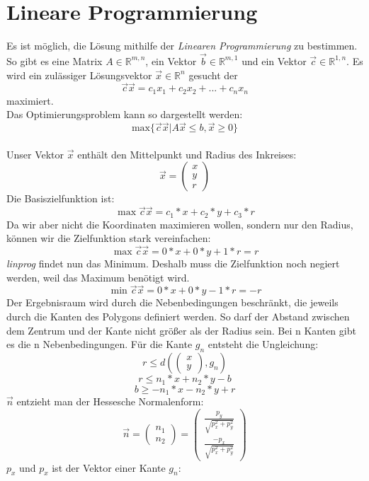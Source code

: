 \documentclass[conference]{IEEEtran}
\begin{document}
	\section{Lineare Programmierung}
	Es ist möglich, die Lösung mithilfe der \textit{Linearen Programmierung} zu bestimmen. So gibt es eine Matrix $A \in \mathbb{R}^{m,n}$, ein Vektor $\vec{b} \in \mathbb{R}^{m,1}$ und ein Vektor $\vec{c} \in \mathbb{R}^{1,n}$.	Es wird ein zulässiger Lösungsvektor $\vec{x} \in \mathbb{R}^{n}$ gesucht der
	\[ \vec{c}\vec{x} = c_1x_1 + c_2x_2+ ... + c_nx_n \]
	maximiert.\\
	Das Optimierungsproblem kann so dargestellt werden:
	\[ \text{max}\{\vec{c}\vec{x} | A\vec{x} \leq b, \vec{x} \geq 0\} \]
	\cite{b2}\\
	Unser Vektor $\vec{x}$ enthält den Mittelpunkt und Radius des Inkreises:
	\[ \vec{x} = \left(\begin{array}{c}x\\y\\r\end{array}\right) \]
	Die Basiszielfunktion ist:
	\[\max \vec{c}\vec{x} = c_1*x+c_2*y+c_3*r \]
	Da wir aber nicht die Koordinaten maximieren wollen, sondern nur den Radius, können wir die Zielfunktion stark vereinfachen:
	\[ \max \vec{c}\vec{x} = 0*x+0*y+1*r = r \]
	\textit{linprog} findet nun das Minimum. Deshalb muss die Zielfunktion noch negiert werden, weil das Maximum benötigt wird.\\
	\[ \min \vec{c}\vec{x} = 0*x+0*y-1*r = -r \]
	Der Ergebnisraum wird durch die Nebenbedingungen beschränkt, die jeweils durch die Kanten des Polygons definiert werden. So darf der Abstand zwischen dem Zentrum und der Kante nicht größer als der Radius sein. Bei n Kanten gibt es die n Nebenbedingungen. Für die Kante $g_n$ entsteht die Ungleichung:
	\[  r \leq d(\left(\begin{array}{c}x\\y\end{array}\right), g_n) \]
	\[  r \leq n_1 * x + n_2 * y - b \]
	\[  b \geq -n_1 * x - n_2 * y + r \]
	$\vec{n}$ entzieht man der Hessesche Normalenform:
	\[ \vec{n} =  \left(\begin{array}{c}n_1\\n_2\end{array}\right) = \left(\begin{array}{c}\frac{p_y}{\sqrt{p_x^2+p_y^2}}\\\frac{-p_x}{\sqrt{p_x^2+p_y^2}}\end{array}\right) \]
	$p_x$ und $p_x$ ist der Vektor einer Kante $g_n$:\\
\end{document}
